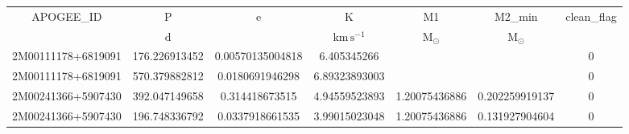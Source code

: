 \begin{table}
\begin{tabular}{ccccccc}
APOGEE_ID & P & e & K & M1 & M2_min & clean_flag \\
 & $\mathrm{d}$ &  & $\mathrm{km\,s^{-1}}$ & $\mathrm{M_{\odot}}$ & $\mathrm{M_{\odot}}$ &  \\
2M00111178+6819091 & 176.226913452 & 0.00570135004818 & 6.405345266 &  &  & 0 \\
2M00111178+6819091 & 570.379882812 & 0.0180691946298 & 6.89323893003 &  &  & 0 \\
2M00241366+5907430 & 392.047149658 & 0.314418673515 & 4.94559523893 & 1.20075436886 & 0.202259919137 & 0 \\
2M00241366+5907430 & 196.748336792 & 0.0337918661535 & 3.99015023048 & 1.20075436886 & 0.131927904604 & 0 \\
\end{tabular}
\end{table}
